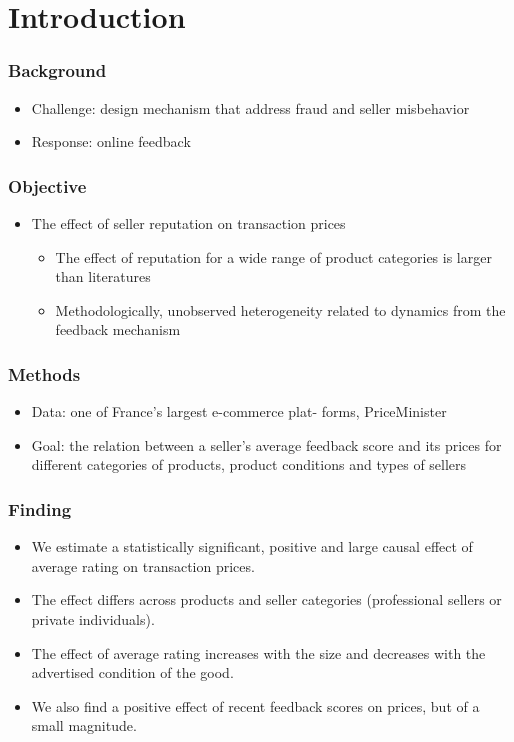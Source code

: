 \documentclass{beamer}
\begin{document}
\section{Introduction}
\begin{frame}
\frametitle{Background}
\begin{itemize}
\item Challenge: design mechanism that address fraud and seller misbehavior
\item Response: online feedback
\end{itemize}
\end{frame}

\begin{frame}
\frametitle{Objective}
\begin{itemize}
\item The effect of seller reputation on transaction prices
\begin{itemize}
  \item The effect of reputation for a wide range of product categories is larger than literatures
  \item Methodologically, unobserved heterogeneity related to dynamics from the feedback mechanism
\end{itemize}
\end{itemize}
\end{frame}

\begin{frame}
\frametitle{Methods}
\begin{itemize}
\item Data: one of France’s largest e-commerce plat- forms, PriceMinister
\item Goal: the relation between a seller’s average feedback score and its prices for different categories of products, product conditions and types of sellers
\end{itemize}
\end{frame}

\begin{frame}
\frametitle{Finding}
\begin{itemize}
\item We estimate a statistically significant, positive and large causal effect of average rating on transaction prices.
\item The effect differs across products and seller categories (professional sellers or private individuals).
\item The effect of average rating increases with the size and decreases with the advertised condition of the good.
\item We also find a positive effect of recent feedback scores on prices, but of a small magnitude.
\end{itemize}
\end{frame}
\end{document}
